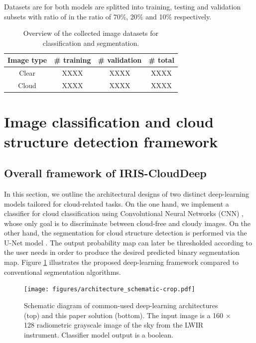 \documentclass[amt, article]{copernicus}
\begin{document}
Datasets are for both models are splitted into training, testing and validation subsets with ratio of in the ratio of 70\%, 20\% and 10\% respectively.

\begin{table}[t]
\begin{center}
    \caption{Overview of the collected image datasets for classification and segmentation.}
    \begin{tabular}{c c c c} 
        \tophline
     Image type & \# training & \# validation & \# total \\ [1.0ex]
     \hline
     Clear & XXXX & XXXX & XXXX \\ [1.0ex]
     \hline
     Cloud & XXXX & XXXX & XXXX \\ [1.0ex]
     \hline
    \end{tabular}
    \belowtable{}
    \end{center}

\end{table}

\section{Image classification and cloud structure detection framework}

\subsection{Overall framework of IRIS-CloudDeep}

In this section, we outline the architectural designs of two distinct deep-learning models tailored for cloud-related tasks. On the one hand, we implement a classifier for cloud classification using Convolutional Neural Networks (CNN) \citep{lecun1995convolutional, Krizhevsky2012}, whose only goal is to discriminate between cloud-free and cloudy images. On the other hand, the segmentation for cloud structure detection is performed via the U-Net model \citep{UNET}. The output probability map can later be thresholded according to the user needs in order to produce the desired predicted binary segmentation map. Figure \ref{fig:architecture_schematic} illustrates the proposed deep-learning framework compared to conventional segmentation algorithms.

\begin{figure}[t]
	\texttt{[image: figures/architecture\_schematic-crop.pdf]}
	\caption{Schematic diagram of common-used deep-learning architectures (top) and this paper solution (bottom). The input image is a 160 × 128 radiometric grayscale image of the sky from the LWIR instrument. Classifier model output is a boolean.}
    \label{fig:architecture_schematic}
\end{figure}
\end{document}
